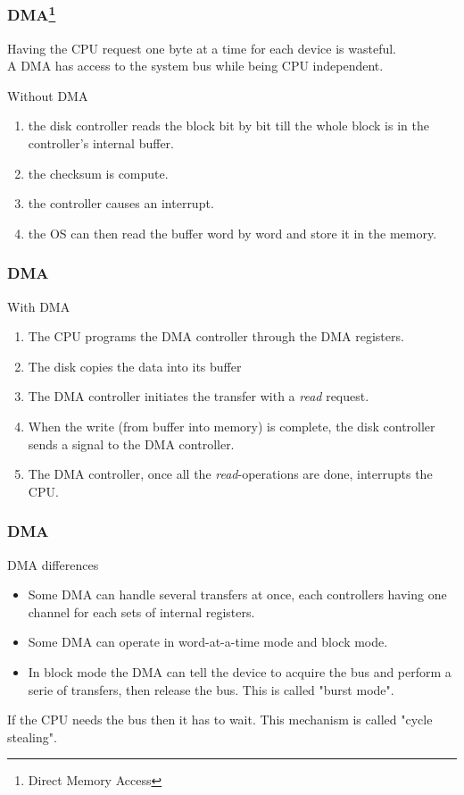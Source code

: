 \begin{frame}
  \frametitle{DMA\footnote{Direct Memory Access}}
  Having the CPU request one byte at a time for each device is wasteful.\\
  A DMA has access to the system bus while being CPU independent.
  \begin{block}{Without DMA}
    \begin{enumerate}
      \item the disk controller reads the block bit by bit till the whole block is in the controller's internal buffer.
      \item the checksum is compute.
      \item the controller causes an interrupt.
      \item the OS can then read the buffer word by word and store it in the memory.
    \end{enumerate}
  \end{block}
\end{frame}

\begin{frame}
  \frametitle{DMA}
  \begin{block}{With DMA}
    \begin{enumerate}
      \item The CPU programs the DMA controller through the DMA registers.
      \item The disk copies the data into its buffer
      \item The DMA controller initiates the transfer with a \emph{read} request.
      \item When the write (from buffer into memory) is complete, the disk controller sends a signal to the DMA controller.
      \item The DMA controller, once all the \emph{read}-operations are done, interrupts the CPU.
    \end{enumerate}
  \end{block}
\end{frame}

\begin{frame}
  \frametitle{DMA}
  \begin{block}{DMA differences}
    \begin{itemize}
      \item Some DMA can handle several transfers at once, each controllers having one channel for each sets of internal registers.
      \item Some DMA can operate in word-at-a-time mode and block mode.
      \item In block mode the DMA can tell the device to acquire the bus and perform a serie of transfers, then release the bus. This is called "burst mode".
    \end{itemize}
  \end{block}
  If the CPU needs the bus then it has to wait. This mechanism is called "cycle stealing".
\end{frame}

